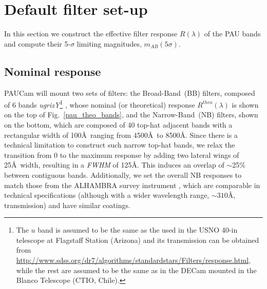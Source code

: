 \section{Default filter set-up}
\label{sec:filt}

In this section we construct the effective filter response $R(\lambda)$ of the PAU bands and compute their 5-$\sigma$ limiting magnitudes, $m_{AB}(5\sigma)$.

\subsection{Nominal response}
PAUCam will mount two sets of filters: the Broad-Band~(BB) filters, composed of 6 bands \textit{ugrizY}\footnote{The $u$ band is assumed to be the same as the used in the USNO 40-in telescope at Flagstaff Station (Arizona) and its transmission can be obtained from \url{http://www.sdss.org/dr7/algorithms/standardstars/Filters/response.html}, while the rest are assumed to be the same as in the DECam mounted in the Blanco Telescope (CTIO, Chile).}%
, whose nominal (or theoretical) response $R^{theo}(\lambda)$ is shown on the top of Fig.~\ref{pau_theo_bands}, and the Narrow-Band~(NB) filters, shown on the bottom, which are composed of 40 top-hat adjacent bands with a rectangular width of 100\AA \ ranging from 4500\AA \ to 8500\AA. Since there is a technical limitation to construct such narrow top-hat bands, we relax the transition from 0 to the maximum response by adding two lateral wings of 25\AA \ width, resulting in a \textit{FWHM} of 125\AA. This induces an overlap of $\sim$25\% between contiguous bands. Additionally, we set the overall NB responses to match those from the ALHAMBRA survey instrument \citep{Moles2008}, which are comparable in technical specifications (although with a wider wavelength range, $\sim 310$\AA, transmission) and have similar coatings.
